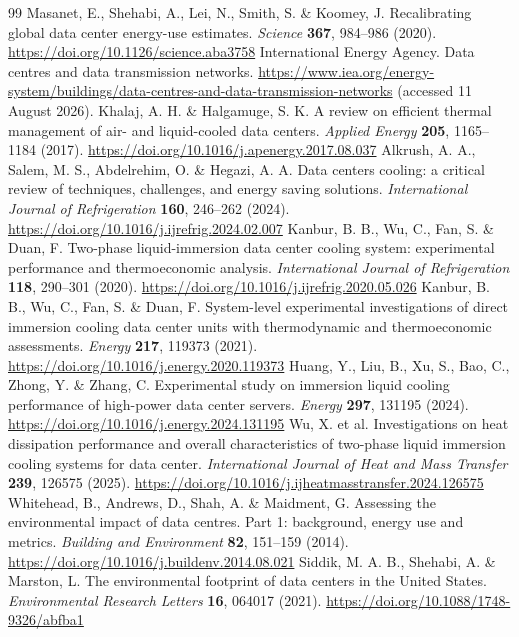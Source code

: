 \documentclass[review,a4paper,fleqn]{cas-sc}
\begin{document}
\begin{thebibliography}{99}
 Masanet, E., Shehabi, A., Lei, N., Smith, S. \& Koomey, J. Recalibrating global data center energy-use estimates. \textit{Science} \textbf{367}, 984--986 (2020). \url{https://doi.org/10.1126/science.aba3758}
 International Energy Agency. Data centres and data transmission networks. \url{https://www.iea.org/energy-system/buildings/data-centres-and-data-transmission-networks} (accessed 11 August 2026).
 Khalaj, A. H. \& Halgamuge, S. K. A review on efficient thermal management of air- and liquid-cooled data centers. \textit{Applied Energy} \textbf{205}, 1165--1184 (2017). \url{https://doi.org/10.1016/j.apenergy.2017.08.037}
 Alkrush, A. A., Salem, M. S., Abdelrehim, O. \& Hegazi, A. A. Data centers cooling: a critical review of techniques, challenges, and energy saving solutions. \textit{International Journal of Refrigeration} \textbf{160}, 246--262 (2024). \url{https://doi.org/10.1016/j.ijrefrig.2024.02.007}
 Kanbur, B. B., Wu, C., Fan, S. \& Duan, F. Two-phase liquid-immersion data center cooling system: experimental performance and thermoeconomic analysis. \textit{International Journal of Refrigeration} \textbf{118}, 290--301 (2020). \url{https://doi.org/10.1016/j.ijrefrig.2020.05.026}
 Kanbur, B. B., Wu, C., Fan, S. \& Duan, F. System-level experimental investigations of direct immersion cooling data center units with thermodynamic and thermoeconomic assessments. \textit{Energy} \textbf{217}, 119373 (2021). \url{https://doi.org/10.1016/j.energy.2020.119373}
 Huang, Y., Liu, B., Xu, S., Bao, C., Zhong, Y. \& Zhang, C. Experimental study on immersion liquid cooling performance of high-power data center servers. \textit{Energy} \textbf{297}, 131195 (2024). \url{https://doi.org/10.1016/j.energy.2024.131195}
 Wu, X. et al. Investigations on heat dissipation performance and overall characteristics of two-phase liquid immersion cooling systems for data center. \textit{International Journal of Heat and Mass Transfer} \textbf{239}, 126575 (2025). \url{https://doi.org/10.1016/j.ijheatmasstransfer.2024.126575}
 Whitehead, B., Andrews, D., Shah, A. \& Maidment, G. Assessing the environmental impact of data centres. Part 1: background, energy use and metrics. \textit{Building and Environment} \textbf{82}, 151--159 (2014). \url{https://doi.org/10.1016/j.buildenv.2014.08.021}
 Siddik, M. A. B., Shehabi, A. \& Marston, L. The environmental footprint of data centers in the United States. \textit{Environmental Research Letters} \textbf{16}, 064017 (2021). \url{https://doi.org/10.1088/1748-9326/abfba1}

\end{thebibliography}
\end{document}
